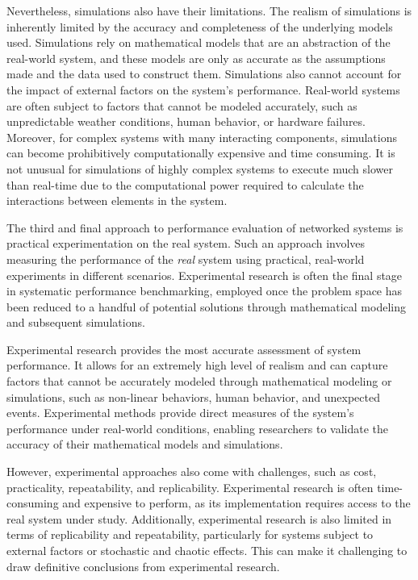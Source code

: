 Nevertheless, simulations also have their limitations.
The realism of simulations is inherently limited by the accuracy and completeness of the underlying models used.
Simulations rely on mathematical models that are an abstraction of the real-world system, and these models are only as accurate as the assumptions made and the data used to construct them.
Simulations also cannot account for the impact of external factors on the system's performance.
Real-world systems are often subject to factors that cannot be modeled accurately, such as unpredictable weather conditions, human behavior, or hardware failures.
Moreover, for complex systems with many interacting components, simulations can become prohibitively computationally expensive and time consuming.
It is not unusual for simulations of highly complex systems to execute much slower than real-time due to the computational power required to calculate the interactions between elements in the system.

\medskip

The third and final approach to performance evaluation of networked systems is practical experimentation on the real system.
Such an approach involves measuring the performance of the \emph{real} system using practical, real-world experiments in different scenarios.
Experimental research is often the final stage in systematic performance benchmarking, employed once the problem space has been reduced to a handful of potential solutions through mathematical modeling and subsequent simulations.

Experimental research provides the most accurate assessment of system performance.
It allows for an extremely high level of realism and can capture factors that cannot be accurately modeled through mathematical modeling or simulations, such as non-linear behaviors, human behavior, and unexpected events.
Experimental methods provide direct measures of the system's performance under real-world conditions, enabling researchers to validate the accuracy of their mathematical models and simulations.

However, experimental approaches also come with challenges, such as cost, practicality, repeatability, and replicability.
Experimental research is often time-consuming and expensive to perform, as its implementation requires access to the real system under study.
Additionally, experimental research is also limited in terms of replicability and repeatability, particularly for systems subject to external factors or stochastic and chaotic effects.
This can make it challenging to draw definitive conclusions from experimental research.

